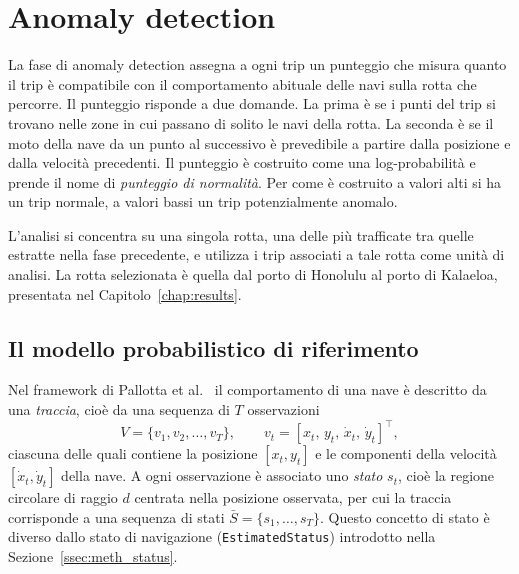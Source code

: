 \section{Anomaly detection}\label{sec:meth_anomaly}

La fase di anomaly detection assegna a ogni trip un punteggio che misura quanto il trip è compatibile
con il comportamento abituale delle navi sulla rotta che percorre. Il punteggio risponde a due domande.
La prima è se i punti del trip si trovano nelle zone in cui passano di solito le navi della rotta.
La seconda è se il moto della nave da un punto al successivo è prevedibile a partire dalla posizione
e dalla velocità precedenti. Il punteggio è costruito come una log-probabilità e prende il nome di
\emph{punteggio di normalità}. Per come è costruito a valori alti si ha un trip normale, a valori bassi un trip
potenzialmente anomalo.

L'analisi si concentra su una singola rotta, una delle più trafficate tra quelle estratte nella fase
precedente, e utilizza i trip associati a tale rotta come unità di analisi. La rotta selezionata è
quella dal porto di Honolulu al porto di Kalaeloa, presentata nel Capitolo~\ref{chap:results}.

\subsection{Il modello probabilistico di riferimento}\label{ssec:meth_model}

Nel framework di Pallotta et al.~\cite{pallotta} il comportamento di una nave è descritto da una \emph{traccia}, cioè da una sequenza
di $T$ osservazioni
\[
    V = \{v_1, v_2, \dots, v_T\}, \qquad v_t = [x_t,\, y_t,\, \dot{x}_t,\, \dot{y}_t]^\top ,
\]
ciascuna delle quali contiene la posizione $[x_t, y_t]$ e le componenti della velocità
$[\dot{x}_t, \dot{y}_t]$ della nave. A ogni osservazione è associato uno \emph{stato} $s_t$, cioè la
regione circolare di raggio $d$ centrata nella posizione osservata, per cui la traccia corrisponde a
una sequenza di stati $\bar{S} = \{s_1, \dots, s_T\}$. Questo concetto di stato è diverso dallo
stato di navigazione (\texttt{EstimatedStatus}) introdotto nella Sezione~\ref{ssec:meth_status}.

